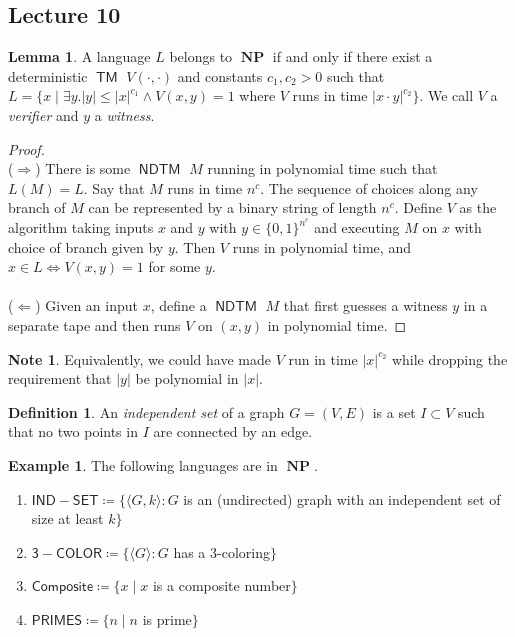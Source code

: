 \documentclass[10pt,letterpaper,cm]{nupset}
\theoremstyle{definition}
\newtheorem*{definition}{Definition}
\newtheorem{exmp}{Example}
\newtheorem{note}{Note}
\newtheorem{lemma}{Lemma}
\newcommand{\1}{\mathbf{1}}
\newcommand{\0}{\vec 0}
\DeclareMathOperator{\TM}{\mathsf{TM}}
\DeclareMathOperator{\NP}{\mathbf{NP}}
\DeclareMathOperator{\NDTM}{\mathsf{NDTM}}
\begin{document}
\subsection{Lecture 10}

\begin{lemma}
A language $L$  belongs to $\NP$ if and only if there exist  a deterministic $\TM$ $V(\cdot, \cdot)$ and constants $c_1, c_2 >0$ such that $L = \{ x \mid \exists y.|y| \leq |x|^{c_1} \land V(x,y) = 1$ where $V$ runs in time $|x\cdot y|^{c_2}\}$. We call $V$ a \textit{verifier} and $y$ a \textit{witness}.
\end{lemma}
\begin{proof} $ $
\\
($\Longrightarrow$) There is some $\NDTM$ $M$ running in polynomial time such that $L(M) = L$. Say that $M$ runs in time $n^c$. The sequence of choices along any branch of $M$ can be represented by a binary string of length $n^c$.
Define $V$ as the algorithm taking inputs $x$ and $y$ with $y\in  \{0,1\}^{n^c}$ and executing $M$ on $x$ with choice of branch given by $y$. Then $V$ runs in polynomial time, and $x\in L \iff V(x,y) =1$ for some $y$.
\\ \\
($\Longleftarrow$)  Given an input $x$, define a $\NDTM$ $M$ that first guesses a witness $y$ in a separate tape and then runs $V$ on $(x,y)$ in polynomial time. 
\end{proof}

\begin{note}
Equivalently, we could have made $V$ run in time $|x|^{c_2}$ while dropping the requirement that $|y|$ be polynomial in $|x|$. 
\end{note}

\begin{definition}
An \textit{independent set} of a graph $G=(V,E)$ is a set $I\subset V$ such that no two points in $I$ are connected by an edge. 
\end{definition}

\begin{exmp} The following languages are in $\NP$.
\begin{enumerate}
\item $\mathsf{IND{-}SET} \coloneqq \{\langle G, k \rangle : G$ is an (undirected) graph with an independent set of size at least $k\}$
\item $\mathsf{3{-}COLOR}\coloneqq \{ \langle G \rangle : G$ has a $3$-coloring$\}$
\item $\mathsf{Composite} \coloneqq \{x \mid x$ is a composite number$\}$
\item $\mathsf{PRIMES}\coloneqq \{ n \mid n$ is prime$\}$
\end{enumerate}
\end{exmp}
\end{document}
